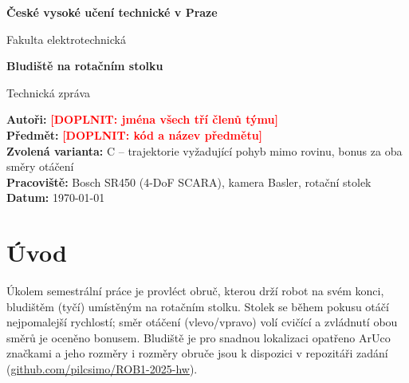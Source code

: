 \documentclass[11pt,a4paper]{article}
\newcommand{\doplnit}[1]{\textcolor{red}{\textbf{[DOPLNIT: #1]}}}
\begin{document}
\begin{titlepage}
  \centering
  \vspace*{3cm}
  {\large\bfseries České vysoké učení technické v Praze\par}
  Fakulta elektrotechnická\par
  \vspace{2.5cm}
  {\LARGE\bfseries Bludiště na rotačním stolku\par}
  \vspace{1cm}
  {\large Technická zpráva\par}
  \vspace{2.5cm}
  \raggedright
  \textbf{Autoři:} \doplnit{jména všech tří členů týmu}\\
  \textbf{Předmět:} \doplnit{kód a název předmětu}\\
  \textbf{Zvolená varianta:} C -- trajektorie vyžadující pohyb mimo rovinu, bonus za oba směry otáčení\\
  \textbf{Pracoviště:} Bosch SR450 (4-DoF SCARA), kamera Basler, rotační stolek\\
  \textbf{Datum:} \today
\end{titlepage}

\begin{abstract}
Zpráva popisuje řešení, ve kterém průmyslový robot Bosch SR450 provlékne obruč bludištěm
umístěným na otáčejícím se stolku. Poloha a otáčení desky s bludištěm se určí z kamery pomocí
dvou ArUco značek. Robot pak předem spočítá časový plán, ve kterém je střed obruče v každém kroku
na tyči, a plán projede. Plán hlídá také kolizi robota s bludištěm. Pokud je bludiště mimo dosah
robota nebo kamera nevidí obě ArUco značky, program to zjistí a nahlásí ještě před zahájením
pohybu. Řešení odpovídá variantě C zadání (trajektorie mimo rovinu, rotační stolek) a bylo
otestováno pro oba směry otáčení stolku.
\end{abstract}

\section{Úvod}

Úkolem semestrální práce je provléct obruč, kterou drží robot na svém konci, bludištěm
(tyčí) umístěným na rotačním stolku. Stolek se během pokusu otáčí nejpomalejší rychlostí;
směr otáčení (vlevo/vpravo) volí cvičící a zvládnutí obou směrů je oceněno bonusem. Bludiště je
pro snadnou lokalizaci opatřeno ArUco značkami a jeho rozměry i rozměry obruče jsou k
dispozici v repozitáři zadání
(\href{https://github.com/pilcsimo/ROB1-2025-hw}{github.com/pilcsimo/ROB1-2025-hw}).
\end{document}
